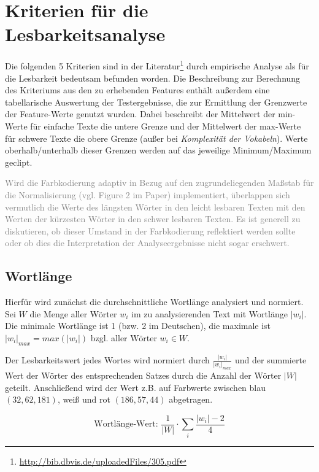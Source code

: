 \documentclass[10pt,a4paper]{article}
\begin{document}
	\section*{Kriterien für die Lesbarkeitsanalyse}
	Die folgenden 5 Kriterien sind in der Literatur\footnote{\url{http://bib.dbvis.de/uploadedFiles/305.pdf}} durch empirische Analyse als für die Lesbarkeit bedeutsam befunden worden. Die Beschreibung zur Berechnung des Kriteriums aus den zu erhebenden Features enthält außerdem eine tabellarische Auswertung der Testergebnisse, die zur Ermittlung der Grenzwerte der Feature-Werte genutzt wurden. Dabei beschreibt der Mittelwert der min-Werte für einfache Texte die untere Grenze und der Mittelwert der max-Werte für schwere Texte die obere Grenze (außer bei \textit{Komplexität der Vokabeln}). Werte oberhalb/unterhalb dieser Grenzen werden auf das jeweilige Minimum/Maximum geclipt.
	
	\textcolor{gray}{Wird die Farbkodierung adaptiv in Bezug auf den zugrundeliegenden Maßstab für die Normalisierung (vgl. Figure 2 im Paper) implementiert, überlappen sich vermutlich die Werte des längsten Wörter in den leicht lesbaren Texten mit den Werten der kürzesten Wörter in den schwer lesbaren Texten. Es ist generell zu diskutieren, ob dieser Umstand in der Farbkodierung reflektiert werden sollte oder ob dies die Interpretation der Analyseergebnisse nicht sogar erschwert.}
	
	\subsection*{Wortlänge}
	Hierfür wird zunächst die durchschnittliche Wortlänge analysiert und normiert. 
	Sei $ W $ die Menge aller Wörter $ w_i $ im zu analysierenden Text mit Wortlänge $ |w_i| $. Die minimale Wortlänge ist 1 (bzw. 2 im Deutschen), die maximale ist $ |w_i|_{max}=max(|w_i|) $ bzgl. aller Wörter $ w_i\in W $. 
	
	Der Lesbarkeitswert jedes Wortes wird normiert durch $ \frac{|w_i|}{|w_i|_{max}}$ und der summierte Wert der Wörter des entsprechenden Satzes durch die Anzahl der Wörter $ |W| $ geteilt. Anschließend wird der Wert z.B. auf Farbwerte zwischen blau $ (32,62,181) $, weiß und rot $ (186,57,44) $ abgetragen.
		
	\begin{equation*}
		\text{Wortlänge-Wert: }\frac{1}{|W|}\cdot\sum\limits_i \frac{|w_i|-2}{4}
	\end{equation*}
		
\end{document}
